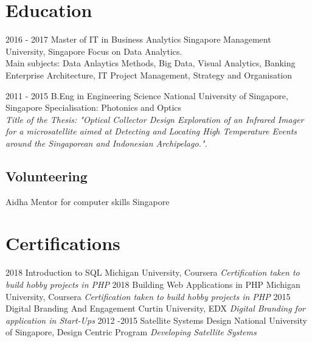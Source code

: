 \documentclass[]{friggeri-cv}
\begin{document}
\section{Education}
\begin{entrylist}
  \entry
    {2016 - 2017}
    {Master of IT in Business Analytics}
    {Singapore Management University, Singapore}
    {Focus on Data Analytics.\\
    Main subjects: Data Anlaytics Methods, Big Data, Visual Analytics, Banking Enterprise Architecture, IT Project Management, Strategy and Organisation\\}
    
  \entry
    {2011 - 2015}
    {B.Eng in Engineering Science}
    {National University of Singapore, Singapore}
    {Specialisation: Photonics and Optics\\
    \emph{Title of the Thesis: "Optical Collector Design Exploration of an Infrared Imager for a microsatellite aimed at Detecting and Locating High Temperature Events around the Singaporean and Indonesian Archipelago.".}}

\end{entrylist}
\newpage
\begin{aside}
\section{Volunteering}
    Aidha Mentor for computer skills
    Singapore
\end{aside}

\section{Certifications}
\begin{entrylist}
 \entry
 {2018}
    {Introduction to SQL}
    {Michigan University, Coursera}
    {\emph{Certification taken to build hobby projects in PHP}}
 \entry
    {2018}
    {Building Web Applications in PHP}
    {Michigan University, Coursera}
    {\emph{Certification taken to build hobby projects in PHP}}
  \entry
    {2015}
    {Digital Branding And Engagement}
    {Curtin University, EDX}
    {\emph{Digital Branding for application in Start-Ups}}
  \entry
    {2012 -2015}
    {Satellite Systems Design}
    {National University of Singapore, Design Centric Program}
    {\emph{Developing Satellite Systems}}
 
    
\end{entrylist}
\end{document}
